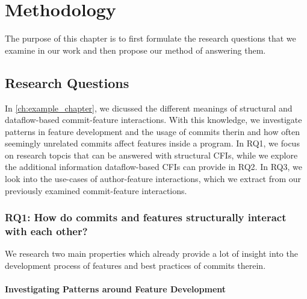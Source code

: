 \chapter{Methodology}\label{ch:methodology}

The purpose of this chapter is to first formulate the research questions that we examine in our work and then propose our method of answering them.

\section{Research Questions}\label{sec:research_questions}

In \autoref{ch:example_chapter}, we dicussed the different meanings of structural and dataflow-based commit-feature interactions.
With this knowledge, we investigate patterns in feature development and the usage of commits therin and how often seemingly unrelated commits affect features inside a program.
In RQ1, we focus on research topcis that can be answered with structural CFIs, while we explore the additional information dataflow-based CFIs can provide in RQ2.
In RQ3, we look into the use-cases of author-feature interactions, which we extract from our previously examined commit-feature interactions.

\subsection{\textbf{RQ1}: How do commits and features structurally interact with each other?}\label{sec:meth:RQ1}

We research two main properties which already provide a lot of insight into the development process of features and best practices of commits therein.

\subsubsection*{Investigating Patterns around Feature Development}

